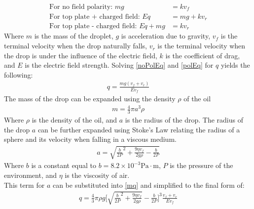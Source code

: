 \documentclass[%
 reprint,
 amsmath,amssymb,
 aps,
]{revtex4-2}
\begin{document}
\begin{align}
    \text{For no field polarity: } mg &= k v_f \label{noPolEq} \\
    \text{For top plate + charged field: } Eq &= mg+kv_r \label{polEq} \\
    \text{For top plate - charged field: } Eq + mg &= kv_r
\end{align}
Where $m$ is the mass of the droplet, $g$ is acceleration due to gravity, $v_f$ is the terminal velocity when the drop naturally falls, $v_r$ is the terminal velocity when the drop is under the influence of the electric field, $k$ is the coefficient of drag, and $E$ is the electric field strength. 
Solving \eqref{noPolEq} and \eqref{polEq} for $q$ yields the following:
\begin{align}
    q = \frac{mg(v_f+v_r)}{Ev_f} \label{mq}
\end{align}
The mass of the drop can be expanded using the density $\rho$ of the oil 
\begin{align}
    m = \frac{4}{3}\pi a^3\rho
\end{align}
Where $\rho$ is the density of the oil, and $a$ is the radius of the drop. 
The radius of the drop $a$ can be further expanded using Stoke's Law relating the radius of a sphere and its velocity when falling in a viscous medium. 
\begin{align}
    a = \sqrt{\frac{b}{2{P}}^2+\frac{9\eta v_f}{2g\rho}-\frac{b}{2P}}
\end{align}
Where $b$ is a constant equal to $b = 8.2 \times 10^{-3} \text{Pa} \cdot \text{m}$, $P$ is the pressure of the environment, and $\eta$ is the viscosity of air.
\\
This term for $a$ can be substituted into \eqref{mq} and simplified to the final form of:
\begin{align}
    q = \frac{4}{3}\pi \rho g \Bigg[\sqrt{\frac{b}{2P}^2+\frac{9\eta v_f}{2g\rho}}-\frac{b}{2P}\Bigg]^3\frac{v_f+v_r}{Ev_f}
    \label{bigQ}
\end{align}
\end{document}
